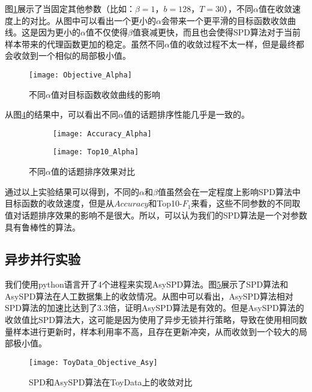图\ref{fig:Objective_Alpha}展示了当固定其他参数（比如：$\beta=1$，$b=128$，$T=30$），不同$\alpha$值在收敛速度上的对比。从图中可以看出一个更小的$\alpha$会带来一个更平滑的目标函数收敛曲线。这是因为更小的$\alpha$值不仅使得$\beta$值衰减更快，而且也会使得SPD算法对于当前样本带来的代理函数更加的稳定。虽然不同$\alpha$值的收敛过程不太一样，但是最终都会收敛到一个相似的局部极小值。
\begin{figure}[!htbp]
    \centering
    \texttt{[image: Objective\_Alpha]}
    \caption{不同$\alpha$值对目标函数收敛曲线的影响}
    \label{fig:Objective_Alpha}
\end{figure}

从图\ref{fig:differentalpha}的结果中，可以看出不同$\alpha$值的话题排序性能几乎是一致的。
\begin{figure}[!htbp]
    \centering
    \begin{subfigure}[b]{0.5\textwidth}
      \texttt{[image: Accuracy\_Alpha]}
      \caption{}
      \label{fig:Accuracy_Alpha}
    \end{subfigure}%
    \begin{subfigure}[b]{0.5\textwidth}
      \texttt{[image: Top10\_Alpha]}
      \caption{}
      \label{fig:Top10_Alpha}
    \end{subfigure}
    \caption{不同$\alpha$值的话题排序效果对比}
    \label{fig:differentalpha}
\end{figure}

通过以上实验结果可以得到，不同的$\alpha$和$\beta$值虽然会在一定程度上影响SPD算法中目标函数的收敛速度，但是从$Accuracy$和Top10-$F_1$来看，这些不同参数的不同取值对话题排序效果的影响不是很大。所以，可以认为我们的SPD算法是一个对参数具有鲁棒性的算法。


\subsection{异步并行实验}

我们使用python语言开了4个进程来实现AsySPD算法。图\ref{fig:ToyData_Objective_AsySPD}展示了SPD算法和AsySPD算法在人工数据集上的收敛情况。从图中可以看出，AsySPD算法相对SPD算法的加速比达到了3.3倍，证明AsySPD算法是有效的。但是AsySPD算法的收敛值比SPD算法大，这可能是因为使用了异步无锁并行策略，导致在使用相同数量样本进行更新时，样本利用率不高，且存在更新冲突，从而收敛到一个较大的局部极小值。
\begin{figure}[!htbp]
    \centering
    \texttt{[image: ToyData\_Objective\_Asy]}
    \caption{SPD和AsySPD算法在ToyData上的收敛对比}
    \label{fig:ToyData_Objective_AsySPD}
\end{figure}

